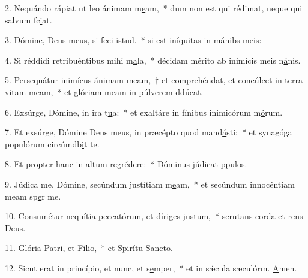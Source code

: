 2. Nequándo rápiat ut leo ánimam m\uline{e}am,~* dum non est qui rédimat, neque qui salvum fc\uline{i}at.\par 
3. Dómine, Deus meus, si feci \uline{i}stud.~* si est iníquitas in mánibs m\uline{e}is:\par 
4. Si réddidi retribuéntibus mihi m\uline{a}la,~* décidam mérito ab inimícis meis n\uline{á}nis.\par 
5. Persequátur inimícus ánimam \uline{me}am,~† et comprehéndat, et concúlcet in terra vitam m\uline{e}am,~* et glóriam meam in púlverem dd\uline{ú}cat.\par 
6. Exsúrge, Dómine, in ira t\uline{u}a:~* et exaltáre in fínibus inimicórum m\uline{ó}rum.\par 
7. Et exsúrge, Dómine Deus meus, in præcépto quod mand\uline{á}sti:~* et synagóga populórum circúmdb\uline{i}t te.\par 
8. Et propter hanc in altum regr\uline{é}dere:~* Dóminus júdicat pp\uline{u}los.\par 
9. Júdica me, Dómine, secúndum justítiam m\uline{e}am,~* et secúndum innocéntiam meam sp\uline{e}r me.\par 
10. Consumétur nequítia peccatórum, et díriges j\uline{u}stum,~* scrutans corda et rens D\uline{e}us.\par 
11. Glória Patri, et F\uline{í}lio,~* et Spirítu S\uline{a}ncto.\par 
12. Sicut erat in princípio, et nunc, et s\uline{e}mper,~* et in sǽcula sæculórm. \uline{A}men.\par 
